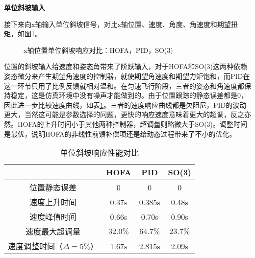 \textbf{单位斜坡输入}

接下来向x轴输入单位斜坡信号，对比x轴位置、速度、角度、角速度和期望扭矩，如图\ref{matlab_t}。

\begin{figure}[h]
  \centering
  \begin{minipage}[t]{0.33\textwidth}
    \centering
  \end{minipage}\hfill
  \begin{minipage}[t]{0.33\textwidth}
    \centering
  \end{minipage}\hfill
  \begin{minipage}[t]{0.33\textwidth}
    \centering
  \end{minipage}
  \caption{x轴位置单位斜坡响应对比：HOFA，PID，SO(3)}
  \label{matlab_t}
\end{figure}

位置的斜坡输入给速度和姿态角带来了阶跃输入，对于HOFA和SO(3)这两种依赖姿态微分来产生期望角速度的控制器，就使期望角速度和期望力矩饱和，而PID在这一环节只用了比例反馈就相对温和。在匀速飞行阶段，三者的姿态和角速度都保持稳定，这是仿真环境中没有噪声才能做到的。由于位置跟踪的静态误差都是0，因此进一步比较速度曲线，如表\ref{matlab斜坡对比}。三者的速度响应曲线都是欠阻尼，PID的波动更大，当然这可能是参数选择的问题，更快的响应速度意味着更大的超调，反之亦然。HOFA的上升时间小于其他两种控制器，超调量则略微大于SO(3)。调整时间是最优，说明HOFA的非线性前馈补偿项还是给动态过程带来了不小的优化。

\begin{table}[h]
  \centering
  \begin{tabular}{cccc}
      \toprule
      & HOFA & PID & SO(3) \\
      \midrule
    位置静态误差                  & 0    & 0 & 0 \\
    速度上升时间                   & 0.37s & 0.385s &0.48s \\
    速度峰值时间                  & 0.66s &0.70s  & 0.90s\\
    速度最大超调量                & $32.0\%$ & $64.7\%$  & $23.7\%$\\
    速度调整时间（$\Delta = 5\%$） & 1.67s &2.815s  & 2.09s\\
      \bottomrule
  \end{tabular}
  \caption{单位斜坡响应性能对比}
  \label{matlab斜坡对比}
\end{table}

